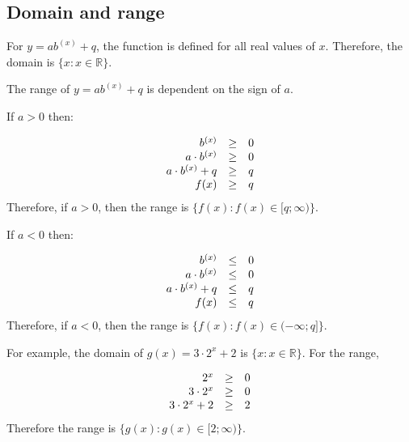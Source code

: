 \subsection*{Domain and range}
\nopagebreak
For $y=a{b}^{(x)}+q$, the function is defined for all real values of $x$. Therefore, the domain is $\{x:x\in \mathbb{R}\}$.\par 
The range of $y=a{b}^{(x)}+q$ is dependent on the sign of $a$.\par 
If $a>0$ then:\par 
\nopagebreak\noindent{}
\begin{equation*}
\begin{array}{ccc}\hfill {b}^{(x)}& \ge & 0\hfill \\ \hfill a\ensuremath{\cdot}{b}^{(x)}& \ge & 0\hfill \\ \hfill a\ensuremath{\cdot}{b}^{(x)}+q& \ge & q\hfill \\ \hfill f(x)& \ge & q\hfill \end{array}
\end{equation*}
Therefore, if $a>0$, then the range is $\{f(x):f(x)\in [q;\infty )\}$.\par 
If $a<0$ then:\par 
\nopagebreak\noindent{}
\begin{equation*}
\begin{array}{ccc}\hfill {b}^{(x)}& \le & 0\hfill \\ \hfill a\ensuremath{\cdot}{b}^{(x)}& \le & 0\hfill \\ \hfill a\ensuremath{\cdot}{b}^{(x)}+q& \le & q\hfill \\ \hfill f(x)& \le & q\hfill \end{array}
\end{equation*}
Therefore, if $a<0$, then the range is $\{f(x):f(x)\in (-\infty ;q]\}$.\par 
For example, the domain of $g(x)=3\ensuremath{\cdot}{2}^{x}+2$ is $\{x:x\in \mathbb{R}\}$.
For the range,\par 
\nopagebreak\noindent{}
\begin{equation*}
\begin{array}{ccc}\hfill {2}^{x}& \ge & 0\hfill \\ \hfill 3\ensuremath{\cdot}{2}^{x}& \ge & 0\hfill \\ \hfill 3\ensuremath{\cdot}{2}^{x}+2& \ge & 2\hfill \end{array}
\end{equation*}
Therefore the range is $\{g(x):g(x)\in [2;\infty )\}$.\par 

